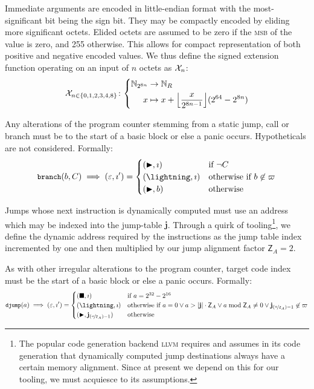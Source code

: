 Immediate arguments are encoded in little-endian format with the most-significant bit being the sign bit. They may be compactly encoded by eliding more significant octets. Elided octets are assumed to be zero if the \textsc{msb} of the value is zero, and 255 otherwise. This allows for compact representation of both positive and negative encoded values. We thus define the signed extension function operating on an input of $n$ octets as $\mathcal{X}_n$:
\begin{align}\label{eq:signedextension}
  \sext_{n \in \{0, 1, 2, 3, 4, 8\}}\colon\left\{\begin{aligned}
    \N_{2^{8n}} &\to \N_R\\
    x &\mapsto x + \ffrac{x}{2^{8n-1}}(2^{64}-2^{8n})
  \end{aligned}\right.
\end{align}

Any alterations of the program counter stemming from a static jump, call or branch must be to the start of a basic block or else a panic occurs. Hypotheticals are not considered. Formally:
\begin{equation}
  \token{branch}(b, C) \implies (\varepsilon, \imath') = \begin{cases}
    (\continue, \imath) &\when \lnot C \\
    (\panic, \imath) &\otherwhen b \not\in \basicblocks \\
    (\continue, b) &\otherwise
  \end{cases}
\end{equation}

Jumps whose next instruction is dynamically computed must use an address which may be indexed into the jump-table $\mathbf{j}$. Through a quirk of tooling\footnote{The popular code generation backend \textsc{llvm} requires and assumes in its code generation that dynamically computed jump destinations always have a certain memory alignment. Since at present we depend on this for our tooling, we must acquiesce to its assumptions.}, we define the dynamic address required by the instructions as the jump table index incremented by one and then multiplied by our jump alignment factor $\mathsf{Z}_A = 2$.

As with other irregular alterations to the program counter, target code index must be the start of a basic block or else a panic occurs. Formally:
\begin{equation}\label{eq:jumptablealignment}
  \token{djump}(a) \implies (\varepsilon, \imath') = \begin{cases}
    (\halt, \imath) &\when a = 2^{32} - 2^{16}\\
    (\panic, \imath) &\otherwhen a = 0 \vee a > |\mathbf{j}|\cdot\mathsf{Z}_A \vee a \bmod \mathsf{Z}_A \ne 0 \vee \mathbf{j}_{(\nicefrac{a}{\mathsf{Z}_A}) - 1} \not\in \basicblocks \\
    (\continue, \mathbf{j}_{(\nicefrac{a}{\mathsf{Z}_A}) - 1}) &\otherwise
  \end{cases}
\end{equation}


